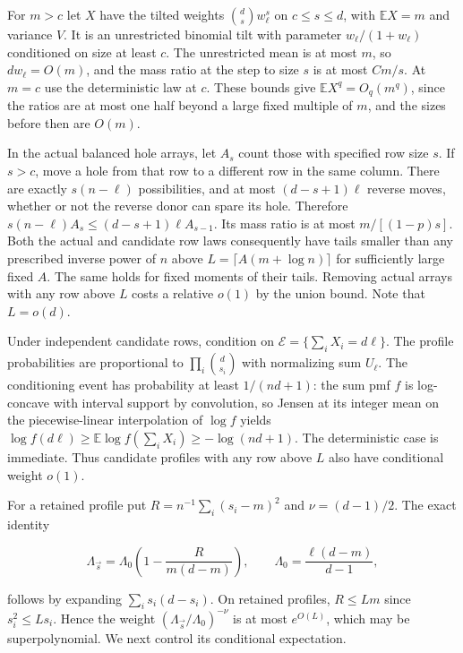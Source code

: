For $m>c$ let $X$ have the tilted weights $\binom ds w_\ell^s$ on $c\le s\le d$, with $\mathbb E X=m$ and variance $V$. It is an unrestricted binomial tilt with parameter $w_\ell/(1+w_\ell)$ conditioned on size at least $c$. The unrestricted mean is at most $m$, so $dw_\ell=O(m)$, and the mass ratio at the step to size $s$ is at most $Cm/s$. At $m=c$ use the deterministic law at $c$. These bounds give $\mathbb E X^q=O_q(m^q)$, since the ratios are at most one half beyond a large fixed multiple of $m$, and the sizes before then are $O(m)$.

In the actual balanced hole arrays, let $A_s$ count those with specified row size $s$. If $s>c$, move a hole from that row to a different row in the same column. There are exactly $s(n-\ell)$ possibilities, and at most $(d-s+1)\ell$ reverse moves, whether or not the reverse donor can spare its hole. Therefore $s(n-\ell)A_s\le (d-s+1)\ell A_{s-1}$. Its mass ratio is at most $m/[(1-p)s]$. Both the actual and candidate row laws consequently have tails smaller than any prescribed inverse power of $n$ above $L=\lceil A(m+\log n)\rceil$ for sufficiently large fixed $A$. The same holds for fixed moments of their tails. Removing actual arrays with any row above $L$ costs a relative $o(1)$ by the union bound. Note that $L=o(d)$.

Under independent candidate rows, condition on $\mathcal E=\{\sum_iX_i=d\ell\}$. The profile probabilities are proportional to $\prod_i\binom d{s_i}$ with normalizing sum $U_\ell$. The conditioning event has probability at least $1/(nd+1)$: the sum pmf $f$ is log-concave with interval support by convolution, so Jensen at its integer mean on the piecewise-linear interpolation of $\log f$ yields $\log f(d\ell)\ge\mathbb E\log f(\sum_iX_i)\ge-\log(nd+1)$. The deterministic case is immediate. Thus candidate profiles with any row above $L$ also have conditional weight $o(1)$.

For a retained profile put $R=n^{-1}\sum_i(s_i-m)^2$ and $\nu=(d-1)/2$. The exact identity

\begin{equation*}
\Lambda_{\vec s}
=\Lambda_0\left(1-\frac{R}{m(d-m)}\right),\qquad
\Lambda_0=\frac{\ell(d-m)}{d-1},
\end{equation*}

follows by expanding $\sum_i s_i(d-s_i)$. On retained profiles, $R\le Lm$ since $s_i^2\le Ls_i$. Hence the weight $(\Lambda_{\vec s}/\Lambda_0)^{-\nu}$ is at most $e^{O(L)}$, which may be superpolynomial. We next control its conditional expectation.

